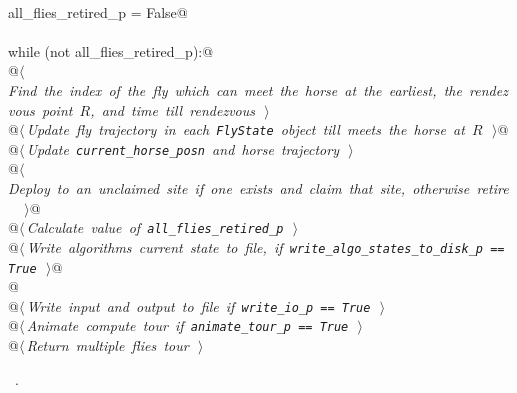 \documentclass[11.5pt]{report}
\begin{document}
\begin{flushleft}
\begin{minipage}{\linewidth}
\begin{list}{}{}
\mbox{}\verb@@\\
\mbox{}\verb@    all_flies_retired_p = False@\\
\mbox{}\verb@@\\
\mbox{}\verb@    while (not all_flies_retired_p):@\\
\mbox{}\verb@       @\hbox{$\langle\,${\itshape Find the index of the fly  which can meet the horse at the earliest, the rendezvous point $R$, and time till rendezvous}\nobreak\ {\footnotesize {}}$\,\rangle$}\verb@@\\
\mbox{}\verb@       @\hbox{$\langle\,${\itshape Update fly trajectory in each \verb|FlyState| object till  meets the horse at $R$}\nobreak\ {\footnotesize {}}$\,\rangle$}\verb@ @\\
\mbox{}\verb@       @\hbox{$\langle\,${\itshape Update \verb|current_horse_posn| and horse trajectory}\nobreak\ {\footnotesize {}}$\,\rangle$}\verb@@\\
\mbox{}\verb@       @\hbox{$\langle\,${\itshape Deploy  to an unclaimed site if one exists and claim that site, otherwise retire }\nobreak\ {\footnotesize {}}$\,\rangle$}\verb@ @\\
\mbox{}\verb@       @\hbox{$\langle\,${\itshape Calculate value of \verb|all_flies_retired_p|}\nobreak\ {\footnotesize {}}$\,\rangle$}\verb@@\\
\mbox{}\verb@       @\hbox{$\langle\,${\itshape Write algorithms current state to file, if \verb|write_algo_states_to_disk_p == True|}\nobreak\ {\footnotesize {}}$\,\rangle$}\verb@ @\\
\mbox{}\verb@    @\\
\mbox{}\verb@    @\hbox{$\langle\,${\itshape Write input and output to file if \verb|write_io_p == True|}\nobreak\ {\footnotesize {}}$\,\rangle$}\verb@@\\
\mbox{}\verb@    @\hbox{$\langle\,${\itshape Animate compute tour if \verb|animate_tour_p == True|}\nobreak\ {\footnotesize {}}$\,\rangle$}\verb@@\\
\mbox{}\verb@    @\hbox{$\langle\,${\itshape Return multiple flies tour}\nobreak\ {\footnotesize {}}$\,\rangle$}\verb@@\\
\mbox{}\verb@@{\NWsep}
\end{list}
\vspace{-1.5ex}
\footnotesize
\begin{list}{}{\setlength{\itemsep}{-\parsep}\setlength{\itemindent}{-\leftmargin}}
\item \NWtxtMacroRefIn\ .

\item{}
\end{list}
\end{minipage}\vspace{4ex}
\end{flushleft}
\end{document}
